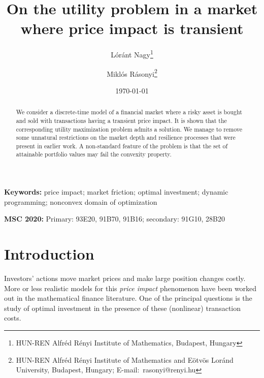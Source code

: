 \documentclass[a4paper]{article}
\begin{document}
\title{On the utility problem in a market where price impact is transient}

\author{L\'or\'ant Nagy\thanks{HUN-REN Alfr\'ed R\'enyi Institute of Mathematics, Budapest, Hungary} \and Mikl\'os 
R\'asonyi\thanks{HUN-REN Alfr\'ed R\'enyi Institute of Mathematics and E\"otv\"os Lor\'and University, Budapest, 
Hungary; E-mail:\ rasonyi@renyi.hu}}


\date{\today}

\maketitle

\begin{abstract}
We consider a discrete-time model of a financial market where a risky asset is bought and sold with transactions having
a transient price impact. It is shown that the corresponding utility maximization problem admits a solution. We manage to remove
some unnatural restrictions on the market depth and resilience processes that were present in earlier work. A non-standard 
feature of the problem is that the set of attainable portfolio values may fail the convexity property.
\end{abstract}

\noindent\textbf{Keywords:} price impact; market friction; optimal investment; dynamic programming; 
nonconvex domain of optimization

\noindent\textbf{MSC 2020:} Primary: 93E20, 91B70, 91B16; secondary: 91G10, 28B20


\section{Introduction}

Investors' actions move market prices and make large position changes costly. More or less realistic models for
this \emph{price impact} phenomenon have been worked out in the mathematical finance literature.
One of the principal questions is the study of optimal investment in the presence of these (nonlinear)
transaction costs.
\end{document}

